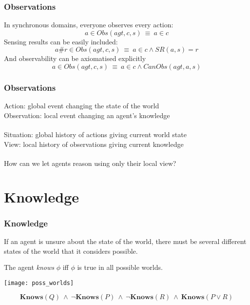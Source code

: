 \documentclass{beamer}
\begin{document}
\begin{frame}
\frametitle{Observations}
In synchronous domains, everyone observes every action:
\begin{equation*}
a \in Obs(agt,c,s)\ \equiv\ a \in c
\end{equation*}
\pause
Sensing results can be easily included:
\begin{equation*}
a\#r \in Obs(agt,c,s)\ \equiv\ a \in c \wedge SR(a,s)=r
\end{equation*}
\pause
And observability can be axiomatised explicitly
\begin{equation*}
a \in Obs(agt,c,s)\ \equiv\ a \in c \wedge CanObs(agt,a,s)
\end{equation*}
\end{frame}

\begin{frame}
\frametitle{Observations}
Action:  global event changing the state of the world\\
Observation:  local event changing an agent's knowledge
\ \\
\ \\
Situation:  global history of actions giving current world state\\
View:  local history of observations giving current knowledge
\ \\
\ \\
\pause
How can we let agents reason using only their local view?
\end{frame}

\section{Knowledge}

\begin{frame}
\frametitle{Knowledge}
If an agent is unsure about the state of the world, there must be several
different states of the world that it considers possible.

The agent \emph{knows} $\phi$ iff $\phi$ is true in all possible worlds.
\begin{center}
  \texttt{[image: poss\_worlds]}
\end{center}
\begin{equation*}
\mathbf{Knows}(Q)\ \wedge\ \neg\mathbf{Knows}(P)\ \wedge\ \neg\mathbf{Knows}(R)\ \wedge\ \mathbf{Knows}(P \vee R)
\end{equation*}

\end{frame}
\end{document}
